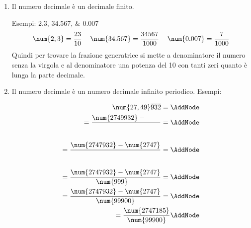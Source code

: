 \begin{enumerate}
	\item Il numero decimale è un decimale finito. 
	
	Esempi: \numlist{2,3;34,567;0.007} 
	\[\begin{tabular}{ccc}
	$\num{2,3}=\dfrac{23}{10}$&$\num{34.567}=\dfrac{34567}{1000}$&$\num{0.007}=\dfrac{7}{1000}$
	\end{tabular}\]
	Quindi per trovare la frazione generatrice si mette a denominatore il numero senza la virgola e al denominatore una potenza del \num{10} con tanti zeri quanto è lunga la parte decimale.
	\item Il numero decimale è un numero decimale infinito periodico. 
	Esempi: 
	
	\begin{NodesList}
		\centering
		\begin{align*}
		\num{27,49}\overline{932}=\AddNode\\ %
		=\dfrac{\num{2749932} -\phantom{2749}}{\phantom{99900}}=\AddNode\\[.5cm] %
		=\dfrac{\num{2747932}-\num{2747}}{\phantom{99900}}=\AddNode\\[.5cm]
		=\dfrac{\num{2747932}-\num{2747}}{\num{999}\phantom{00}}=\AddNode\\
		=\dfrac{\num{2747932}-\num{2747}}{\num{99900}}=\AddNode\\
		=\dfrac{\num{2747185}}{\num{99900}}\AddNode
		\end{align*}
						\end{NodesList}
						

\end{enumerate}
